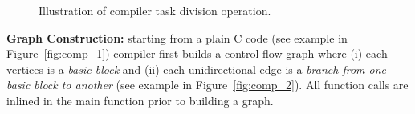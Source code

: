 \begin{figure}
	\centering
	\caption{Illustration of \sys compiler task division operation.}
	\label{fig:compiler_overview}
\end{figure}

\textbf{Graph Construction:} starting from a plain C code (see example in Figure~\ref{fig:comp_1}) \sys compiler first builds a control flow graph where (i) each vertices is a \emph{basic block} and (ii) each unidirectional edge is a \emph{branch from one basic block to another} (see example in Figure~\ref{fig:comp_2}). All function calls are inlined in the main function prior to building a graph.

